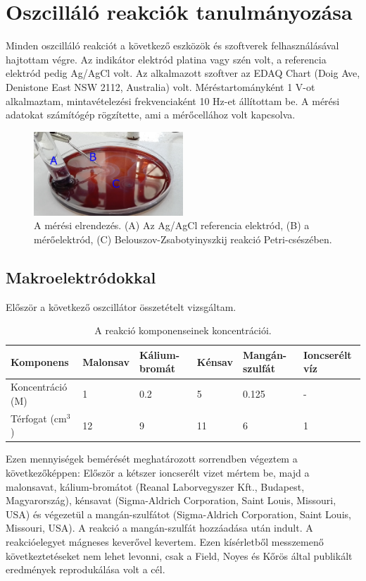 \section{Oszcilláló reakciók tanulmányozása} 

Minden oszcilláló reakciót a következő eszközök és szoftverek felhasználásával hajtottam végre. Az indikátor elektród platina vagy szén volt, a referencia elektród pedig Ag/AgCl volt. Az alkalmazott szoftver az EDAQ Chart (Doig Ave, Denistone East NSW 2112, Australia) volt. Méréstartományként 1 V-ot alkalmaztam, mintavételezési frekvenciaként 10 Hz-et állítottam be. A mérési adatokat számítógép rögzítette, ami a mérőcellához volt kapcsolva.

\begin{figure}[!h]
\centering
\includegraphics[width=0.5\textwidth]{img/setup.png}
\caption{A mérési elrendezés. (A) Az Ag/AgCl referencia elektród, (B) a mérőelektród, (C) Belouszov-Zsabotyinyszkij reakció Petri-csészében.}
\label{fig:setup}
\end{figure}


\subsection{Makroelektródokkal}
Először a következő oszcillátor összetételt vizsgáltam.
\begin{table}[h!]
\centering
\caption{A reakció komponenseinek koncentrációi.}
\small
\label{my-label}
\begin{tabular}{llllll}
Komponens                       & Malonsav & Kálium-bromát & Kénsav & Mangán-szulfát & Ioncserélt víz \\
\hline
Koncentráció (M)                & 1        & 0.2           & 5      & 0.125          & -              \\
Térfogat (cm$^3$) & 12       & 9             & 11     & 6              & 1              \\
\end{tabular}
\normalsize
\end{table}
Ezen mennyiségek bemérését meghatározott sorrendben végeztem a következőképpen: Először a kétszer ioncserélt vizet mértem be, majd a malonsavat, kálium-bromátot (Reanal Laborvegyszer Kft., Budapest, Magyarország), kénsavat (Sigma-Aldrich Corporation, Saint Louis, Missouri, USA) és végezetül a mangán-szulfátot (Sigma-Aldrich Corporation, Saint Louis, Missouri, USA). A reakció a mangán-szulfát hozzáadása után indult. A reakcióelegyet mágneses keverővel kevertem. Ezen kísérletből messzemenő következtetéseket nem lehet levonni, csak a Field, Noyes és Kőrös által publikált eredmények reprodukálása \cite{noyes1972oscillations} volt a cél.

